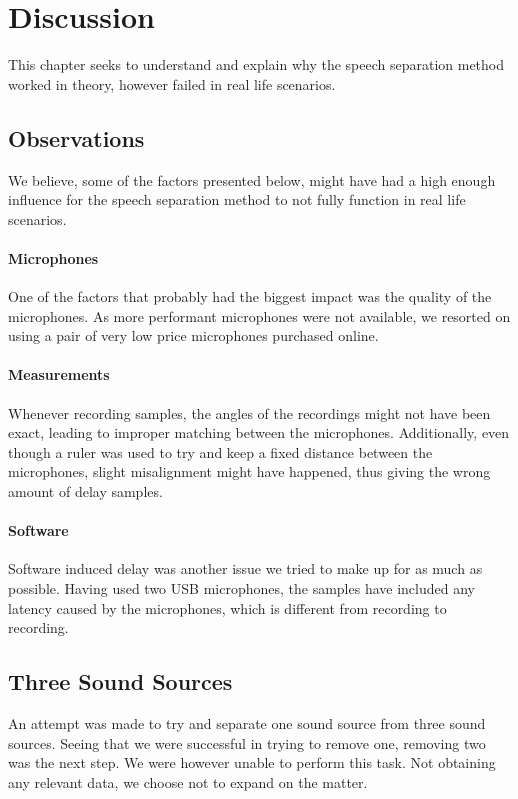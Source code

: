 \chapter{Discussion}\label{ch:discussion}
This chapter seeks to understand and explain why the speech separation method worked in theory,
however failed in real life scenarios.
\section{Observations}
We believe, some of the factors presented below, might have had a high enough influence for the speech 
separation method to not fully function in real life scenarios.
\subsubsection{Microphones}
One of the factors that probably had the biggest impact was the quality of the microphones. As more
performant microphones were not available, we resorted on using a pair of very low price microphones
purchased online.
\subsubsection{Measurements}
Whenever recording samples, the angles of the recordings might not have been exact, leading to improper 
matching between the microphones. Additionally, even though a ruler was used to try and keep a fixed 
distance between the microphones, slight misalignment might have happened, thus giving the wrong
amount of delay samples.
\subsubsection{Software}
Software induced delay was another issue we tried to make up for as much as possible. Having used two USB 
microphones, the samples have included any latency caused by the microphones, which is different from 
recording to recording.\cite{USBLATENCY}
\newpage
\section{Three Sound Sources} 
An attempt was made to try and separate one sound source from three sound sources. Seeing
that we were successful in trying to remove one, removing two was the next step.
We were however unable to perform this task. Not obtaining any relevant data, we choose not 
to expand on the matter.
